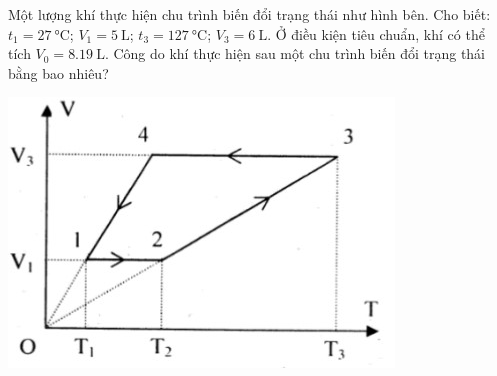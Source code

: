 \begin{ex}
	Một lượng khí thực hiện chu trình biến đổi trạng thái như hình bên. Cho biết: $t_1=\SI{27}{\celsius}$; $V_1=\SI{5}{\liter}$; $t_3=\SI{127}{\celsius}$; $V_3=\SI{6}{\liter}$. Ở điều kiện tiêu chuẩn, khí có thể tích $V_0=\SI{8.19}{\liter}$. Công do khí thực hiện sau một chu trình biến đổi trạng thái bằng bao nhiêu?
	\begin{center}
		\includegraphics[width=0.35\linewidth]{figs/VN12-Y24-PH-SYL-015P-4}
	\end{center}
	
\end{ex}
